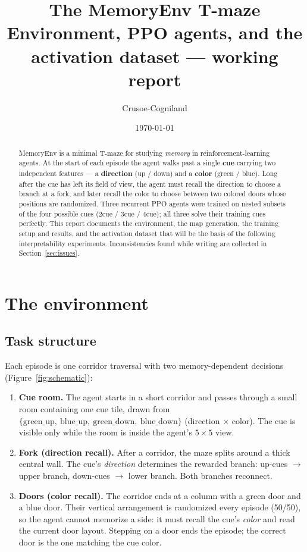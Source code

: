 \documentclass[11pt]{article}
\title{\textbf{The MemoryEnv T-maze}\\[2pt]
\large Environment, PPO agents, and the activation dataset --- working report}
\author{Crusoe-Cogniland}
\date{\today}
\begin{document}
\maketitle

\begin{abstract}
\noindent
MemoryEnv is a minimal T-maze for studying \emph{memory} in reinforcement-learning agents.
At the start of each episode the agent walks past a single \textbf{cue} carrying two independent
features --- a \textbf{direction} (up / down) and a \textbf{color} (green / blue). Long after the
cue has left its field of view, the agent must recall the direction to choose a branch at a fork,
and later recall the color to choose between two colored doors whose positions are randomized.
Three recurrent PPO agents were trained on nested subsets of the four possible cues (2cue / 3cue /
4cue); all three solve their training cues perfectly. This report documents the environment, the
map generation, the training setup and results, and the activation dataset that will be the basis
of the following interpretability experiments. Inconsistencies found while writing are collected
in Section~\ref{sec:issues}.
\end{abstract}

\section{The environment}

\subsection{Task structure}

Each episode is one corridor traversal with two memory-dependent decisions
(Figure~\ref{fig:schematic}):

\begin{enumerate}
  \item \textbf{Cue room.} The agent starts in a short corridor and passes through a small room
        containing one cue tile, drawn from
        $\{\text{green\_up},\ \text{blue\_up},\ \text{green\_down},\ \text{blue\_down}\}$
        (direction $\times$ color). The cue is visible only while the room is inside the agent's
        $5\times5$ view.
  \item \textbf{Fork (direction recall).} After a corridor, the maze splits around a thick central
        wall. The cue's \emph{direction} determines the rewarded branch: up-cues $\rightarrow$
        upper branch, down-cues $\rightarrow$ lower branch. Both branches reconnect.
  \item \textbf{Doors (color recall).} The corridor ends at a column with a green door and a blue
        door. Their vertical arrangement is randomized every episode (50/50), so the agent cannot
        memorize a side: it must recall the cue's \emph{color} and read the current door layout.
        Stepping on a door ends the episode; the correct door is the one matching the cue color.
\end{enumerate}
\end{document}
